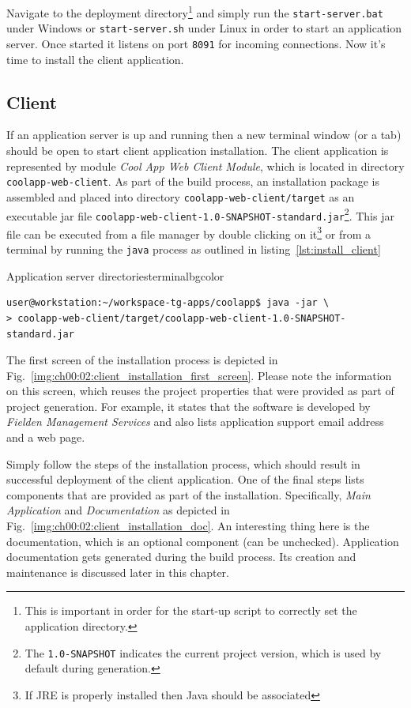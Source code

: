   Navigate to the deployment directory\footnote{This is important in order for the start-up script to correctly set the application directory.} and simply run the \texttt{start-server.bat} under Windows or \texttt{start-server.sh} under Linux in order to start an application server.
  Once started it listens on port \texttt{8091} for incoming connections.
  Now it's time to install the client application.

\subsection{Client}
  \sloppypar
  If an application server is up and running then a new terminal window (or a tab) should be open to start client application installation.
  The client application is represented by module \emph{Cool App Web Client Module}, which is located in directory \texttt{coolapp-web-client}.
  As part of the build process, an installation package is assembled and placed into directory \texttt{coolapp-web-client/target} as an executable jar file \texttt{coolapp-web-client-1.0-SNAPSHOT-standard.jar}\footnote{The \texttt{1.0-SNAPSHOT} indicates the current project version, which is used by default during generation.}.   
  This jar file can be executed from a file manager by double clicking on it\footnote{If JRE is properly installed then Java should be associated} or from a terminal by running the \texttt{java} process as outlined in listing~\ref{lst:install_client}

  \begin{code}{Application server directories}{\label{lst:install_client}}{terminalbgcolor}
     \begin{lstlisting}
user@workstation:~/workspace-tg-apps/coolapp$ java -jar \
> coolapp-web-client/target/coolapp-web-client-1.0-SNAPSHOT-standard.jar
     \end{lstlisting}
  \end{code}

  The first screen of the installation process is depicted in Fig.~\ref{img:ch00:02:client_installation_first_screen}.
  Please note the information on this screen, which reuses the project properties that were provided as part of project generation.
  For example, it states that the software is developed by \emph{Fielden Management Services} and also lists application support email address and a web page.
  
  Simply follow the steps of the installation process, which should result in successful deployment of the client application.
  One of the final steps lists components that are provided as part of the installation.
  Specifically, \emph{Main Application} and \emph{Documentation} as depicted in Fig.~\ref{img:ch00:02:client_installation_doc}.
  An interesting thing here is the documentation, which is an optional component (can be unchecked).
  Application documentation gets generated during the build process.
  Its creation and maintenance is discussed later in this chapter.

